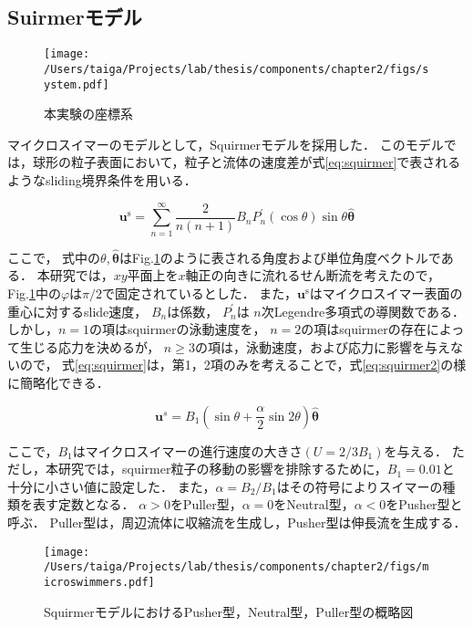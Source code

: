 \subsection{Suirmerモデル}
    \begin{figure}[htbp]
        \centering
        \texttt{[image: /Users/taiga/Projects/lab/thesis/components/chapter2/figs/system.pdf]}
        \caption{本実験の座標系}
        \label{fig:system}
    \end{figure}

マイクロスイマーのモデルとして，Squirmerモデル\cite{}を採用した．
このモデルでは，球形の粒子表面において，粒子と流体の速度差が式\eqref{eq:squirmer}で表されるようなsliding境界条件を用いる．

    \begin{equation}
        \boldsymbol{u}^\mathrm{s} = 
            \sum_{n=1}^\infty\frac{2}{n(n + 1)} B_n P_n^\prime(\cos{\theta}) \sin{\theta} \hat{\boldsymbol{\theta}}
        \label{eq:squirmer}
    \end{equation}

\noindent
ここで， 式中の$\theta, \boldsymbol{\hat{\theta}}$はFig.\ref{fig:system}のように表される角度および単位角度ベクトルである．
本研究では，$xy$平面上を$x$軸正の向きに流れるせん断流を考えたので，
Fig.\ref{fig:system}中の$\varphi$は$\pi / 2$で固定されているとした．
また，$\boldsymbol{u}^\mathrm{s}$はマイクロスイマー表面の重心に対するslide速度，
$B_n$は係数，
$P^\prime_n$は $n$次Legendre多項式の導関数である．
しかし，$n=1$の項はsquirmerの泳動速度を，
$n=2$の項はsquirmerの存在によって生じる応力を決めるが，
$n \geq 3$の項は，泳動速度，および応力に影響を与えないので，
式\eqref{eq:squirmer}は，第1，2項のみを考えることで，式\eqref{eq:squirmer2}の様に簡略化できる．

    \begin{equation}
        \boldsymbol{u}^s =
            B_1 \left( \sin{\theta} + \frac{\alpha}{2} \sin{2\theta} \right) \hat{\boldsymbol{\theta}}
        \label{eq:squirmer2}
    \end{equation}

\noindent
ここで，$B_1$はマイクロスイマーの進行速度の大きさ$(U = 2/3 B_1)$を与える．
ただし，本研究では，squirmer粒子の移動の影響を排除するために，$B_1 = 0.01$と十分に小さい値に設定した．
また，$\alpha = B_2/B_1$はその符号によりスイマーの種類を表す定数となる．
$\alpha > 0$をPuller型，$\alpha = 0$をNeutral型，$\alpha < 0$をPusher型と呼ぶ．
Puller型は，周辺流体に収縮流を生成し，Pusher型は伸長流を生成する．

    \begin{figure}[H]
        \centering
        \texttt{[image: /Users/taiga/Projects/lab/thesis/components/chapter2/figs/microswimmers.pdf]}
        \caption{SquirmerモデルにおけるPusher型，Neutral型，Puller型の概略図}
        \label{fig:squirmermodel}
    \end{figure}
